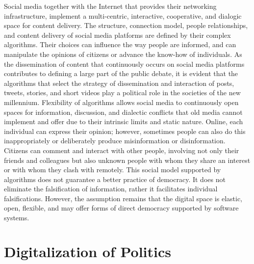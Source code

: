 Social media together with the Internet that provides their networking infrastructure, implement a multi-centric, interactive, cooperative, and dialogic space for content delivery. The structure, connection model, people relationships, and content delivery of social media platforms are defined by their complex algorithms. Their choices can influence the way people are informed, and can manipulate the opinions of citizens or advance the know-how of individuals. As the dissemination of content that continuously occurs on social media platforms contributes to defining a large part of the public debate, it is evident that the algorithms that select the strategy of dissemination and interaction of posts, tweets, stories, and short videos play a political role in the societies of the new millennium. Flexibility of algorithms allows social media to continuously open spaces for information, discussion, and dialectic conflicts that old media cannot implement and offer due to their intrinsic limits and static nature. Online, each individual can express their opinion; however, sometimes people can also do this inappropriately or deliberately produce misinformation or disinformation. Citizens can comment and interact with other people, involving not only their friends and colleagues but also unknown people with whom they share an interest or with whom they clash with remotely. This social model supported by algorithms does not guarantee a better practice of democracy. It does not eliminate the falsification of information, rather it facilitates individual falsifications. However, the assumption remains that the digital space is elastic, open, flexible, and may offer forms of direct democracy supported by software systems.

\section{\label{sec:8.2}Digitalization of Politics}

